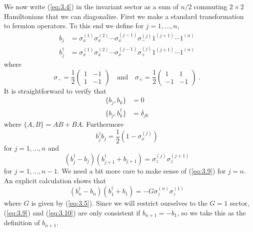 \documentclass[twoside]{article}
\newcommand{\half}{{\textstyle{\frac12}}}
\newcommand{\numEq}[2]{\begin{equation}
   \label{eq:#1}
   #2\end{equation}}
\newcommand{\refEq}[1]{(\ref{eq:#1})}
\numberwithin{equation}{section}
\begin{document}
We now write \refEq{3.4} in the invariant sector as a sum of $n/2$
commuting
$2\times2$ Hamiltonians that we can diagonalize.  First we make a
standard transformation to fermion operators.  To this end we define for
$j=1,\dots,n$, 
\begin{align} b_j &= \sigma_x^{(1)} \sigma_x^{(2)}\cdots  \sigma_x^{(j-1)}
\sigma_-^{(j)} 1^{(j+1)}\cdots 1^{(n)}\nonumber\\[.5ex]
 b_j^\dagger &=
\sigma_x^{(1)} \sigma_x^{(2)}\cdots  \sigma_x^{(j-1)}
\sigma_+^{(j)} 1^{(j+1)}\cdots 1^{(n)}
\label{eq:3.6}
\end{align} where
$$
\sigma_- = \half\begin{pmatrix} 1 & -1\\ 1 & -1
\end{pmatrix} \quad \mbox{and}\quad
\sigma_+ = \half\begin{pmatrix} 1 &  1\\ -1 & -1
\end{pmatrix}\ . 
$$ It is straightforward to verify that
\begin{align}
\{ b_j, b_k\} &= 0 \nonumber\\
\{ b_j, b_k^\dagger \} &= \delta_{jk} 
\label{eq:3.7}
\end{align} where $\{ A, B\} =  AB + BA$. Furthermore
\numEq{3.8}{ b_j^\dagger b_j = \half (1-\sigma_x^{(j)}) } for $j=1,\dots,n$
and 
\numEq{3.9}{ (b_j^\dagger -  b_j) (b_{j+1}^\dagger + b_{j+1}) = 
\sigma_z^{(j)} \sigma_z^{(j+1)}  } for $j=1,\dots,n-1$. We need a bit more
care to make sense of \refEq{3.9} for $j=n$. An explicit calculation shows
that
\numEq{3.10}{ (b_n^\dagger -  b_n) (b_1^\dagger + b_1) = -G \sigma_z^{(n)}
\sigma_z^{(1)}   } where $G$  is given by \refEq{3.5}. Since we will restrict
ourselves to the $G=1$ sector, \refEq{3.9} and \refEq{3.10} are only
consistent if $b_{n+1} = - b_1$, so we take this as the definition of
$b_{n+1}$.
\end{document}
